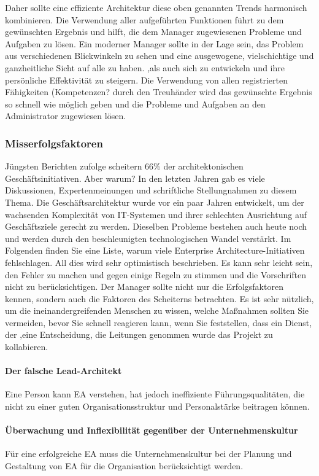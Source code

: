 \documentclass[doc]{apa6}
\begin{document}
Daher sollte eine effiziente Architektur diese oben genannten Trends harmonisch kombinieren. Die Verwendung aller aufgeführten Funktionen führt zu dem gewünschten Ergebnis und hilft, die dem Manager zugewiesenen Probleme und Aufgaben zu lösen. Ein moderner Manager sollte in der Lage sein, das Problem aus verschiedenen Blickwinkeln zu sehen und eine ausgewogene, vielschichtige und ganzheitliche Sicht auf alle zu haben. ,als auch sich zu entwickeln und ihre persönliche Effektivität zu steigern. Die Verwendung von allen registrierten Fähigkeiten (Kompetenzen? durch den Treuhänder wird das gewünschte Ergebnis so schnell wie möglich geben und die Probleme und Aufgaben an den Administrator zugewiesen lösen.


\subsubsection{Misserfolgsfaktoren}
Jüngsten Berichten zufolge scheitern 66\% der architektonischen Geschäftsinitiativen. Aber warum? In den letzten Jahren gab es viele Diskussionen, Expertenmeinungen und schriftliche Stellungnahmen zu diesem Thema.
Die Geschäftsarchitektur wurde vor ein paar Jahren entwickelt, um der wachsenden Komplexität von IT-Systemen und ihrer schlechten Ausrichtung auf Geschäftsziele gerecht zu werden. Dieselben Probleme bestehen auch heute noch und werden durch den beschleunigten technologischen Wandel verstärkt.
Im Folgenden finden Sie eine Liste, warum viele Enterprise Architecture-Initiativen fehlschlagen.
All dies wird sehr optimistisch beschrieben. Es kann sehr leicht sein, den Fehler zu machen und gegen einige Regeln zu stimmen und die Vorschriften nicht zu berücksichtigen. Der Manager sollte nicht nur die Erfolgsfaktoren kennen, sondern auch die Faktoren des Scheiterns betrachten.
Es ist sehr nützlich, um die ineinandergreifenden Menschen zu wissen, welche Maßnahmen sollten Sie vermeiden, bevor Sie schnell reagieren kann, wenn Sie feststellen, dass ein Dienst, der ‚eine Entscheidung, die Leitungen genommen wurde das Projekt zu kollabieren.

\paragraph{Der falsche Lead-Architekt} Eine Person kann EA verstehen, hat jedoch ineffiziente Führungsqualitäten, die nicht zu einer guten Organisationsstruktur und Personalstärke beitragen können.
\paragraph{Überwachung und Inflexibilität gegenüber der Unternehmenskultur} Für eine erfolgreiche EA muss die Unternehmenskultur bei der Planung und Gestaltung von EA für die Organisation berücksichtigt werden.
\end{document}
